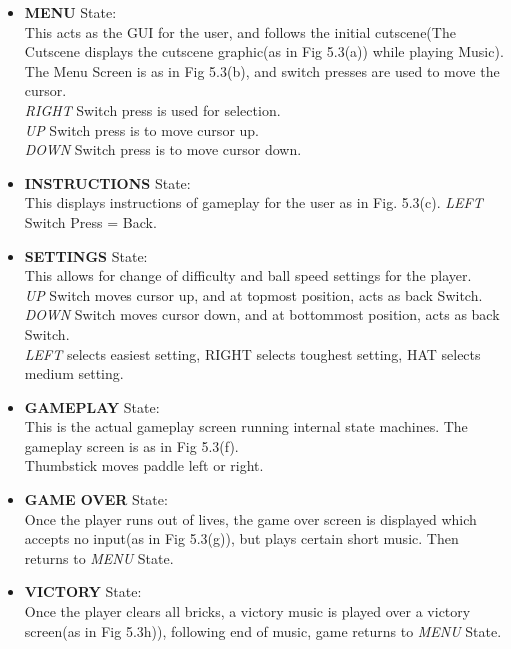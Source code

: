 \documentclass[a4paper,12pt,oneside]{book}
\begin{document}
\begin{itemize}
  \item \textbf{MENU} State: \\ \qquad This acts as the GUI for the user, and follows the initial cutscene(The Cutscene displays the cutscene graphic(as in Fig 5.3(a)) while playing Music).  The Menu Screen is as in Fig 5.3(b), and switch presses are used to move the cursor. 
  \\ \textit{RIGHT} Switch press is used for selection.
  \\ \textit{UP} Switch press is to move cursor up.
  \\ \textit{DOWN} Switch press is to move cursor down.
  \item \textbf{INSTRUCTIONS} State: \\ \qquad This displays instructions of gameplay for the user as in Fig. 5.3(c).
  \textit{LEFT} Switch Press = Back.
  \item \textbf{SETTINGS} State: \\ \qquad This allows for change of difficulty and ball speed settings for the player.
  \\ \textit{UP} Switch moves cursor up, and at topmost position, acts as back Switch.
  \\ \textit{DOWN} Switch moves cursor down, and at bottommost position, acts as back Switch.
  \\ \textit{LEFT} selects easiest setting, RIGHT selects toughest setting, HAT selects medium setting.
  \item \textbf{GAMEPLAY} State: \\ \qquad This is the actual gameplay screen running internal state machines. The gameplay screen is as in Fig 5.3(f).
  \\ Thumbstick moves paddle left or right.
  \item \textbf{GAME OVER} State: \\ \qquad Once the player runs out of lives, the game over screen is displayed which accepts no input(as in Fig 5.3(g)), but plays certain short music. Then returns to \textit{MENU} State.
  \item \textbf{VICTORY} State: \\ \qquad Once the player clears all bricks, a victory music is played over a victory screen(as in Fig 5.3h)), following end of music, game returns to \textit{MENU} State.
\end{itemize}
\end{document}
